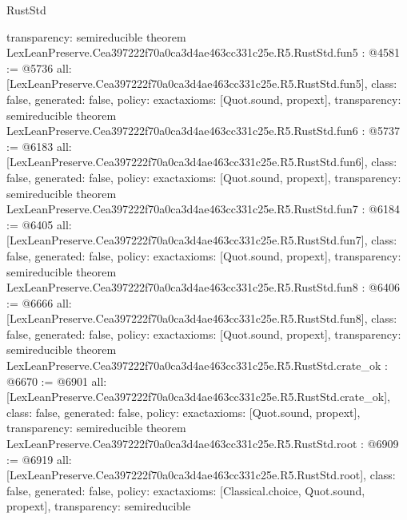 \begin{lexlean}{RustStd}
\begin{coremodule}
{  transparency: semireducible
}
theorem LexLeanPreserve.Cea397222f70a0ca3d4ae463cc331c25e.R5.RustStd.fun5 : @4581 := @5736 {
  all: [LexLeanPreserve.Cea397222f70a0ca3d4ae463cc331c25e.R5.RustStd.fun5],
  class: false,
  generated: false,
  policy: exact{axioms: [Quot.sound, propext]},
  transparency: semireducible
}
theorem LexLeanPreserve.Cea397222f70a0ca3d4ae463cc331c25e.R5.RustStd.fun6 : @5737 := @6183 {
  all: [LexLeanPreserve.Cea397222f70a0ca3d4ae463cc331c25e.R5.RustStd.fun6],
  class: false,
  generated: false,
  policy: exact{axioms: [Quot.sound, propext]},
  transparency: semireducible
}
theorem LexLeanPreserve.Cea397222f70a0ca3d4ae463cc331c25e.R5.RustStd.fun7 : @6184 := @6405 {
  all: [LexLeanPreserve.Cea397222f70a0ca3d4ae463cc331c25e.R5.RustStd.fun7],
  class: false,
  generated: false,
  policy: exact{axioms: [Quot.sound, propext]},
  transparency: semireducible
}
theorem LexLeanPreserve.Cea397222f70a0ca3d4ae463cc331c25e.R5.RustStd.fun8 : @6406 := @6666 {
  all: [LexLeanPreserve.Cea397222f70a0ca3d4ae463cc331c25e.R5.RustStd.fun8],
  class: false,
  generated: false,
  policy: exact{axioms: [Quot.sound, propext]},
  transparency: semireducible
}
theorem LexLeanPreserve.Cea397222f70a0ca3d4ae463cc331c25e.R5.RustStd.crate_ok : @6670 := @6901 {
  all: [LexLeanPreserve.Cea397222f70a0ca3d4ae463cc331c25e.R5.RustStd.crate_ok],
  class: false,
  generated: false,
  policy: exact{axioms: [Quot.sound, propext]},
  transparency: semireducible
}
theorem LexLeanPreserve.Cea397222f70a0ca3d4ae463cc331c25e.R5.RustStd.root : @6909 := @6919 {
  all: [LexLeanPreserve.Cea397222f70a0ca3d4ae463cc331c25e.R5.RustStd.root],
  class: false,
  generated: false,
  policy: exact{axioms: [Classical.choice, Quot.sound, propext]},
  transparency: semireducible
}


\end{coremodule}
\end{lexlean}
